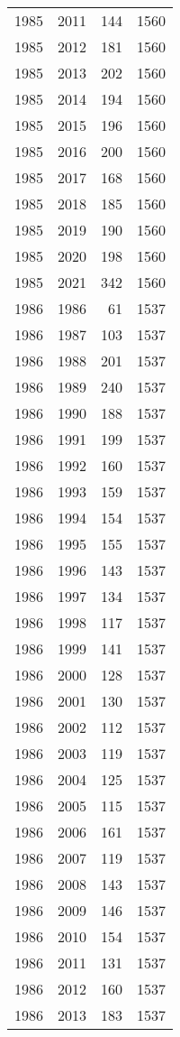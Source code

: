 \documentclass[
  11pt,
  letterpaper,
  DIV=11,
  numbers=noendperiod,
  twoside]{scrartcl}
\begin{document}
\begin{longtable}[]{@{}rrrr@{}}
1985 & 2011 & 144 & 1560 \\
1985 & 2012 & 181 & 1560 \\
1985 & 2013 & 202 & 1560 \\
1985 & 2014 & 194 & 1560 \\
1985 & 2015 & 196 & 1560 \\
1985 & 2016 & 200 & 1560 \\
1985 & 2017 & 168 & 1560 \\
1985 & 2018 & 185 & 1560 \\
1985 & 2019 & 190 & 1560 \\
1985 & 2020 & 198 & 1560 \\
1985 & 2021 & 342 & 1560 \\
1986 & 1986 & 61 & 1537 \\
1986 & 1987 & 103 & 1537 \\
1986 & 1988 & 201 & 1537 \\
1986 & 1989 & 240 & 1537 \\
1986 & 1990 & 188 & 1537 \\
1986 & 1991 & 199 & 1537 \\
1986 & 1992 & 160 & 1537 \\
1986 & 1993 & 159 & 1537 \\
1986 & 1994 & 154 & 1537 \\
1986 & 1995 & 155 & 1537 \\
1986 & 1996 & 143 & 1537 \\
1986 & 1997 & 134 & 1537 \\
1986 & 1998 & 117 & 1537 \\
1986 & 1999 & 141 & 1537 \\
1986 & 2000 & 128 & 1537 \\
1986 & 2001 & 130 & 1537 \\
1986 & 2002 & 112 & 1537 \\
1986 & 2003 & 119 & 1537 \\
1986 & 2004 & 125 & 1537 \\
1986 & 2005 & 115 & 1537 \\
1986 & 2006 & 161 & 1537 \\
1986 & 2007 & 119 & 1537 \\
1986 & 2008 & 143 & 1537 \\
1986 & 2009 & 146 & 1537 \\
1986 & 2010 & 154 & 1537 \\
1986 & 2011 & 131 & 1537 \\
1986 & 2012 & 160 & 1537 \\
1986 & 2013 & 183 & 1537 \\

\end{longtable}
\end{document}
